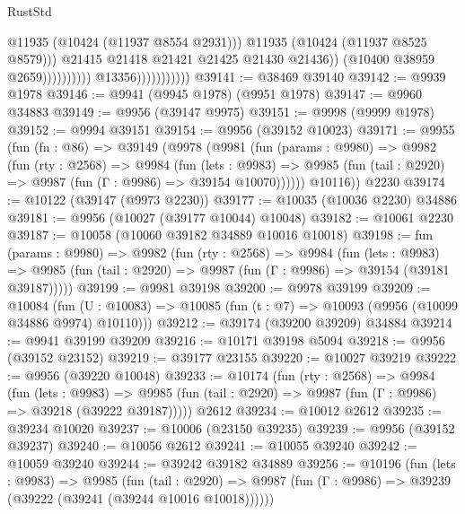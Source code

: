 \begin{lexlean}{RustStd}
\begin{coremodule}
                                                    @11935
                                                    (@10424 (@11937 @8554 @2931)))
                                                  @11935
                                                  (@10424 (@11937 @8525 @8579)))
                                                @21415
                                                @21418
                                                @21421
                                                @21425
                                                @21430
                                                @21436))
                                            (@10400 @38959 @2659))))))))))
                          @13356)))))))))))
@39141 := @38469 @39140
@39142 := @9939 @1978
@39146 := @9941 (@9945 @1978) (@9951 @1978)
@39147 := @9960 @34883
@39149 := @9956 (@39147 @9975)
@39151 := @9998 (@9999 @1978)
@39152 := @9994 @39151
@39154 := @9956 (@39152 @10023)
@39171 := @9955
    (fun (fn : @86) =>
    @39149
      (@9978
        (@9981
          (fun (params : @9980) =>
          @9982
            (fun (rty : @2568) =>
            @9984
              (fun (lets : @9983) =>
              @9985 (fun (tail : @2920) => @9987 (fun (Γ : @9986) => @39154 @10070))))))
        @10116))
    @2230
@39174 := @10122 (@39147 (@9973 @2230))
@39177 := @10035 (@10036 @2230) @34886
@39181 := @9956 (@10027 (@39177 @10044) @10048)
@39182 := @10061 @2230
@39187 := @10058 (@10060 @39182 @34889 @10016 @10018)
@39198 := fun (params : @9980) =>
  @9982
    (fun (rty : @2568) =>
    @9984
      (fun (lets : @9983) =>
      @9985 (fun (tail : @2920) => @9987 (fun (Γ : @9986) => @39154 (@39181 @39187)))))
@39199 := @9981 @39198
@39200 := @9978 @39199
@39209 := @10084
    (fun (U : @10083) => @10085 (fun (t : @7) => @10093 (@9956 (@10099 @34886 @9974) @10110)))
@39212 := @39174 (@39200 @39209) @34884
@39214 := @9941 @39199 @39209
@39216 := @10171 @39198 @5094
@39218 := @9956 (@39152 @23152)
@39219 := @39177 @23155
@39220 := @10027 @39219
@39222 := @9956 (@39220 @10048)
@39233 := @10174
    (fun (rty : @2568) =>
    @9984
      (fun (lets : @9983) =>
      @9985 (fun (tail : @2920) => @9987 (fun (Γ : @9986) => @39218 (@39222 @39187)))))
    @2612
@39234 := @10012 @2612
@39235 := @39234 @10020
@39237 := @10006 (@23150 @39235)
@39239 := @9956 (@39152 @39237)
@39240 := @10056 @2612
@39241 := @10055 @39240
@39242 := @10059 @39240
@39244 := @39242 @39182 @34889
@39256 := @10196
    (fun (lets : @9983) =>
    @9985
      (fun (tail : @2920) =>
      @9987 (fun (Γ : @9986) => @39239 (@39222 (@39241 (@39244 @10016 @10018))))))

\end{coremodule}
\end{lexlean}
